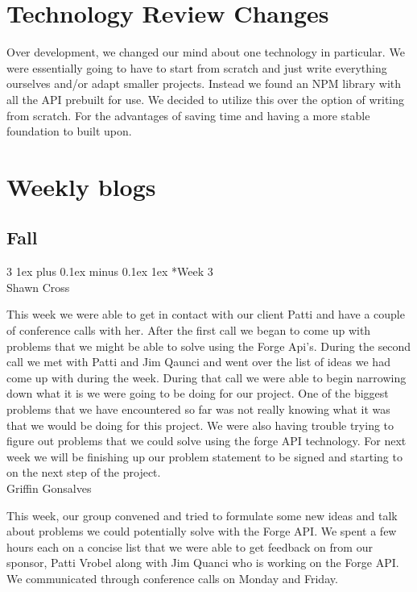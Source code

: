 \documentclass[letterpaper, 10pt, draftclsnofoot, compsoc, onecolumn]{IEEEtran}
\makeatletter
\def\subsubsection{\@startsection{subsubsection}%
                                 {3}%
                                 {\z@}%
                                 {1ex plus 0.1ex minus 0.1ex}%
                                 {1ex}%
                                 {\normalfont\normalsize}}%
\makeatother
\begin{document}
\newpage

\section{Technology Review Changes}
Over development, we changed our mind about one technology in particular. We were essentially going to have to start from scratch and just write everything ourselves and/or adapt smaller projects. Instead we found an NPM library with all the API prebuilt for use. We decided to utilize this over the option of writing from scratch. For the advantages of saving time and having a more stable foundation to built upon.

\newpage

\section{Weekly blogs}
\subsection{Fall}
\subsubsection*{Week 3}\hspace*{\fill} \\

Shawn Cross

This week we were able to get in contact with our client Patti and have a couple of conference calls with her. After the first call we began to come up with problems that we might be able to solve using the Forge Api's. During the second call we met with Patti and Jim Qaunci and went over the list of ideas we had come up with during the week. During that call we were able to begin narrowing down what it is we were going to be doing for our project. One of the biggest problems that we have encountered so far was not really knowing what it was that we would be doing for this project. We were also having trouble trying to figure out problems that we could solve using the forge API technology. For next week we will be finishing up our problem statement to be signed and starting to on the next step of the project.\\

Griffin Gonsalves

This week, our group convened and tried to formulate some new ideas and talk about problems we could potentially solve with the Forge API. We spent a few hours each on a concise list that we were able to get feedback on from our sponsor, Patti Vrobel along with Jim Quanci who is working on the Forge API. We communicated through conference calls on Monday and Friday.
\end{document}
